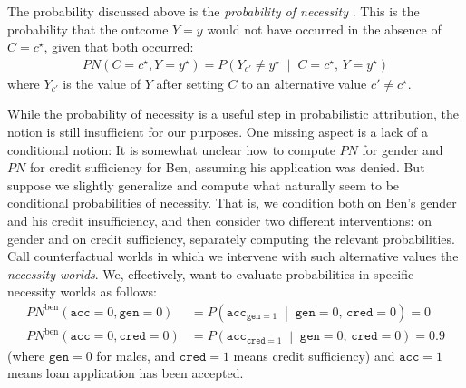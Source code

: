 \documentclass[twoside,11pt]{article}
\begin{document}
The probability discussed above is the \emph{probability of necessity} \cite{pearl2022probabilities}.
This is the probability that the outcome $Y=y$ would not have occurred in the absence of  $C = c^\star$, given that both occurred: 
\begin{align*}
PN(C = c^\star, Y = y^\star) 
  = P\!\left(Y_{c'} \neq y^\star \;\middle|\; C = c^\star,\, Y = y^\star\right)
\end{align*}
where $Y_{c'}$ is the value of $Y$ after setting $C$ to an alternative value $c'\neq c^\star$.

While the probability of necessity is a useful step in probabilistic attribution, the notion is still insufficient for our purposes. One missing aspect is a lack of a conditional notion:
It is somewhat unclear how to compute $PN$ for gender and $PN$ for credit sufficiency for Ben, assuming his application was denied. But suppose we slightly generalize and compute what naturally seem to be conditional probabilities of necessity. That is, we condition both on Ben's gender and his credit insufficiency, and then consider two different interventions: on gender and on credit sufficiency, separately computing the relevant probabilities. Call counterfactual worlds in which we intervene with such alternative values the \emph{necessity worlds}. We, effectively, want to evaluate probabilities in specific necessity worlds as follows:
\begin{align*}
\mathit{PN}^{\text{ben}}(\mathtt{acc} = 0, \mathtt{gen} = 0) 
  &= P\!\left(
      \mathtt{acc}_{\mathtt{gen} = 1} \;\middle|\;
      \mathtt{gen} = 0,\, \mathtt{cred} = 0
    \right) = 0 \\
\mathit{PN}^{\text{ben}}(\mathtt{acc} = 0, \mathtt{cred} = 0) 
  &= P\!\left(
      \mathtt{acc}_{\mathtt{cred} = 1} \;\middle|\;
      \mathtt{gen} = 0,\, \mathtt{cred} = 0
    \right) = 0.9
\end{align*}
\noindent (where  $\mathtt{gen} = 0$ for males, and $\mathtt{cred} = 1$ means credit sufficiency) and $\mathtt{acc}=1$ means loan application has been accepted.
\end{document}
